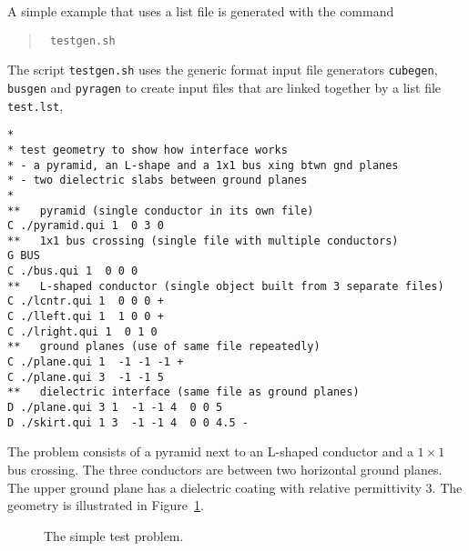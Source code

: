 A simple example that uses a list file is generated with the command
\begin{quote}\tt
testgen.sh
\end{quote}
The script {\tt testgen.sh} uses the generic format
input file generators {\tt cubegen}, {\tt busgen}
and {\tt pyragen} to create input files that are
linked together by a list file {\tt test.lst}, 
\begin{verbatim}
*
* test geometry to show how interface works
* - a pyramid, an L-shape and a 1x1 bus xing btwn gnd planes
* - two dielectric slabs between ground planes
*
**   pyramid (single conductor in its own file)
C ./pyramid.qui 1  0 3 0
**   1x1 bus crossing (single file with multiple conductors)
G BUS
C ./bus.qui 1  0 0 0
**   L-shaped conductor (single object built from 3 separate files)
C ./lcntr.qui 1  0 0 0 +
C ./lleft.qui 1  1 0 0 +
C ./lright.qui 1  0 1 0
**   ground planes (use of same file repeatedly)
C ./plane.qui 1  -1 -1 -1 +
C ./plane.qui 3  -1 -1 5
**   dielectric interface (same file as ground planes)
D ./plane.qui 3 1  -1 -1 4  0 0 5
D ./skirt.qui 1 3  -1 -1 4  0 0 4.5 -
\end{verbatim}
The problem consists of a pyramid next to an L-shaped conductor and
a $1\times 1$ bus crossing. The three conductors are between two horizontal
ground planes. The upper ground plane has a dielectric coating
with relative permittivity 3. The geometry is illustrated in 
Figure~\ref{testpic}.
%
%
\begin{figure}
\centerline{
}
\caption{The simple test problem.}
\label{testpic}
\end{figure}


